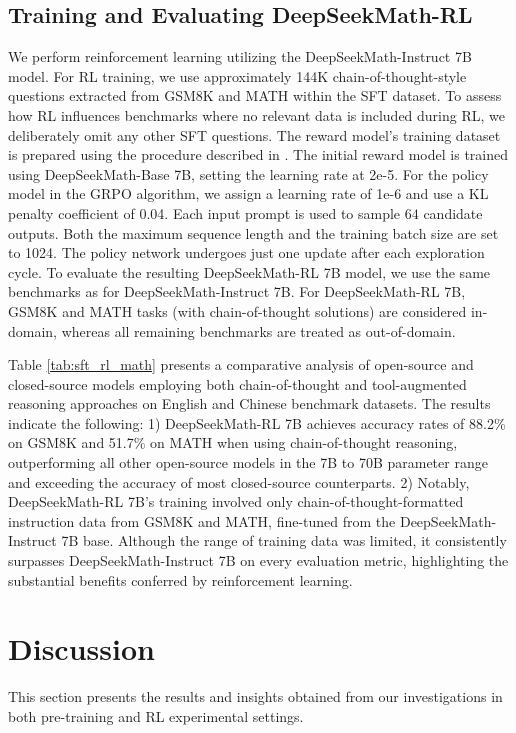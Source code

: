 \begin{itemize}[topsep=0pt]
\begin{itemize}[topsep=0pt]
\subsection{Training and Evaluating DeepSeekMath-RL}

We perform reinforcement learning utilizing the DeepSeekMath-Instruct 7B model. For RL training, we use approximately 144K chain-of-thought-style questions extracted from GSM8K and MATH within the SFT dataset. To assess how RL influences benchmarks where no relevant data is included during RL, we deliberately omit any other SFT questions. The reward model’s training dataset is prepared using the procedure described in \citep{wang2023math}. The initial reward model is trained using DeepSeekMath-Base 7B, setting the learning rate at 2e-5. For the policy model in the GRPO algorithm, we assign a learning rate of 1e-6 and use a KL penalty coefficient of 0.04. Each input prompt is used to sample $64$ candidate outputs. Both the maximum sequence length and the training batch size are set to 1024. The policy network undergoes just one update after each exploration cycle. To evaluate the resulting DeepSeekMath-RL 7B model, we use the same benchmarks as for DeepSeekMath-Instruct 7B. For DeepSeekMath-RL 7B, GSM8K and MATH tasks (with chain-of-thought solutions) are considered in-domain, whereas all remaining benchmarks are treated as out-of-domain.

Table \ref{tab:sft_rl_math} presents a comparative analysis of open-source and closed-source models employing both chain-of-thought and tool-augmented reasoning approaches on English and Chinese benchmark datasets. The results indicate the following: 1) DeepSeekMath-RL 7B achieves accuracy rates of 88.2\% on GSM8K and 51.7\% on MATH when using chain-of-thought reasoning, outperforming all other open-source models in the 7B to 70B parameter range and exceeding the accuracy of most closed-source counterparts. 2) Notably, DeepSeekMath-RL 7B's training involved only chain-of-thought-formatted instruction data from GSM8K and MATH, fine-tuned from the DeepSeekMath-Instruct 7B base. Although the range of training data was limited, it consistently surpasses DeepSeekMath-Instruct 7B on every evaluation metric, highlighting the substantial benefits conferred by reinforcement learning.

\section{Discussion}
This section presents the results and insights obtained from our investigations in both pre-training and RL experimental settings.


\end{itemize}
\end{itemize}

